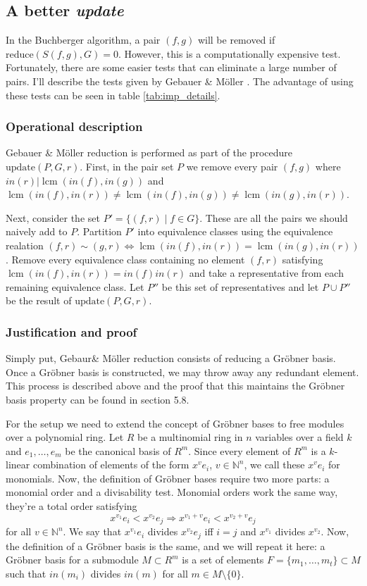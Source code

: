 \documentclass{article}
\theoremstyle{changedot}
\theoremstyle{changedotbreak}
\theoremstyle{nonumberplain}
\newcommand{\m}{\mathbb}
\DeclareMathOperator{\lcm}{lcm}
\begin{document}
\subsection{A better \emph{update}}  \label{sec:update}
In the Buchberger algorithm, a pair $(f, g)$ will be removed if $\text{reduce}(S(f, g), G) = 0$. However, this is a computationally expensive test. Fortunately, there are some easier tests that can eliminate a large number of pairs. I'll describe the tests given by Gebauer \& Möller \cite{GM}. The advantage of using these tests can be seen in table \ref{tab:imp_details}.

\subsubsection{Operational description}
Gebauer \& Möller reduction is performed as part of the procedure $\text{update}(P, G, r)$. First, in the pair set $P$ we remove every pair $(f, g)$ where $in(r) | \lcm(in(f), in(g))$ and $\lcm(in(f), in(r)) \neq \lcm(in(f), in(g)) \neq \lcm(in(g), in(r))$.

Next, consider the set $P' = \{(f, r) \mid f \in G\}$. These are all the pairs we should naively add to $P$. Partition $P'$ into equivalence classes using the equivalence realation $(f, r) \sim (g, r) \Longleftrightarrow \lcm(in(f), in(r)) = \lcm(in(g), in(r))$. Remove every equivalence class containing no element $(f, r)$ satisfying $\lcm(in(f), in(r)) = in(f) in(r)$ and take a representative from each remaining equivalence class. Let $P''$ be this set of representatives and let $P \cup P''$ be the result of $\text{update}(P, G, r)$.


\subsubsection{Justification and proof}
Simply put, Gebaur\& Möller reduction consists of reducing a Gröbner basis. Once a Gröbner basis is constructed, we may throw away any redundant element. This process is described above and the proof that this maintains the Gröbner basis property can be found in \cite{NL} section 5.8.

For the setup we need to extend the concept of Gröbner bases to free modules over a polynomial ring. Let $R$ be a multinomial ring in $n$ variables over a field $k$ and $e_{1}, \dots, e_{m}$ be the canonical basis of $R^{m}$. Since every element of $R^{m}$ is a $k$-linear combination of elements of the form $x^{v}e_{i}$, $v \in \m N^{n}$, we call these $x^{v}e_{i}$ for monomials. Now, the definition of Gröbner bases require two more parts: a monomial order and a divisability test. Monomial orders work the same way, they're a total order satisfying \[x^{v_{1}}e_i < x^{v_{2}}e_{j} \Longrightarrow x^{v_{1} + v} e_{i} < x^{v_{2} + v} e_{j}\] for all $v \in \m N^{n}$. We say that $x^{v_{1}}e_{i}$ divides $x^{v_{2}}e_{j}$ iff $i=j$ and $x^{v_{1}}$ divides $x^{v_{2}}$. Now, the definition of a Gröbner basis is the same, and we will repeat it here: a Gröbner basis for a submodule $M \subset R^{m}$ is a set of elements $F = \{m_{1}, \dots, m_{t}\} \subset M$ such that $in(m_{i})$ divides $in(m)$ for all $m \in M \setminus \{0\}$.
\end{document}

